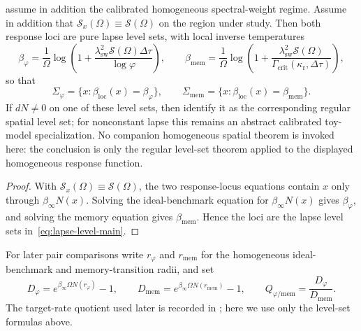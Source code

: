 \begin{corollary}\label{cor:homogeneous-main}
\ResponseStandingClause assume in addition the calibrated homogeneous spectral-weight regime.
Assume in addition that $\mathcal S_x(\Omega)\equiv\mathcal S(\Omega)$ on the
region under study. Then both response loci are pure lapse level sets, with local inverse
temperatures
\begin{equation}\label{eq:betaphi-betamem-main}
\beta_{\varphi}=
\frac{1}{\Omega}
\log\!\left(1+\frac{\lambda_{\mathrm{sw}}^2\mathcal S(\Omega)\Delta\tau}{\log\varphi}\right),
\qquad
\beta_{\mathrm{mem}}=
\frac{1}{\Omega}
\log\!\left(1+\frac{\lambda_{\mathrm{sw}}^2\mathcal S(\Omega)}
{\Gamma_{\mathrm{crit}}(\kappa_{\mathrm r},\Delta\tau)}\right),
\end{equation}
so that
\begin{equation}\label{eq:lapse-level-main}
\Sigma_{\varphi}=\{x:\beta_{\mathrm{loc}}(x)=\beta_{\varphi}\},
\qquad
\Sigma_{\mathrm{mem}}=\{x:\beta_{\mathrm{loc}}(x)=\beta_{\mathrm{mem}}\}.
\end{equation}
If $dN\neq0$ on one of these level sets, then
identify it as the corresponding regular spatial level set; for nonconstant lapse this remains an
abstract calibrated toy-model specialization.
No companion homogeneous spatial theorem is invoked here: the conclusion is only
the regular level-set theorem applied to the displayed homogeneous response
function.
\end{corollary}

\begin{proof}
With $\mathcal S_x(\Omega)\equiv\mathcal S(\Omega)$, the two response-locus
equations contain $x$ only through $\beta_\infty N(x)$. Solving the
ideal-benchmark equation for $\beta_\infty N(x)$ gives $\beta_\varphi$, and
solving the memory equation gives $\beta_{\mathrm{mem}}$. Hence the loci are
the lapse level sets in~\eqref{eq:lapse-level-main}.
\end{proof}

For later pair comparisons write $r_\varphi$ and
$r_{\mathrm{mem}}$ for the homogeneous ideal-benchmark and
memory-transition radii, and set
\[
D_\varphi=e^{\beta_\infty\Omega N(r_\varphi)}-1,
\qquad
D_{\mathrm{mem}}=e^{\beta_\infty\Omega N(r_{\mathrm{mem}})}-1,
\qquad
Q_{\varphi/\mathrm{mem}}=\frac{D_\varphi}{D_{\mathrm{mem}}}.
\]
The target-rate quotient used later is recorded in ; here
we use only the level-set formulas above.

